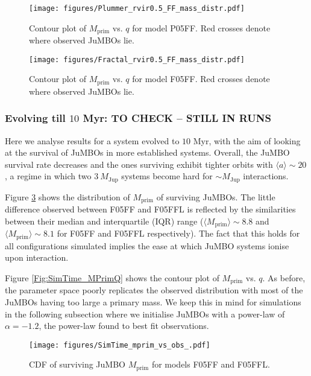 \documentclass[aa]{aa}
\begin{document}
   \begin{figure}
    \centering
        \texttt{[image: figures/Plummer\_rvir0.5\_FF\_mass\_distr.pdf]}
        \caption{Contour plot of $M_{\mathrm{prim}}$ vs. $q$ for model P05FF. Red crosses denote where observed JuMBOs lie.}
         \label{Fig:Gen_mdistr_Plummer}
   \end{figure}
   
   \begin{figure}
    \centering
        \texttt{[image: figures/Fractal\_rvir0.5\_FF\_mass\_distr.pdf]}
        \caption{Contour plot of $M_{\mathrm{prim}}$ vs. $q$ for model F05FF. Red crosses denote where observed JuMBOs lie.}
         \label{Fig:Gen_mdistr_Fractal}
   \end{figure}

    \subsubsection{Evolving till $10$ Myr: TO CHECK -- STILL IN RUNS}
        Here we analyse results for a system evolved to $10$ Myr, with the aim of looking at the survival of JuMBOs in more established systems. Overall, the JuMBO survival rate decreases and the ones surviving exhibit tighter orbits with $\langle a\rangle \sim 20$, a regime in which two $3\ M_{\mathrm{Jup}}$ systems become hard for $\sim M_{\mathrm{Jup}}$ interactions. 
        
        Figure \ref{Fig:Mdistr_SimTime} shows the distribution of $M_{\mathrm{prim}}$ of surviving JuMBOs. The little difference  observed between F05FF and F05FFL is reflected by the similarities between their median and interquartile (IQR) range ($\langle M_{\mathrm{prim}}\rangle\sim 8.8$ and $\langle M_{\mathrm{prim}}\rangle \sim 8.1$ for F05FF and F05FFL respectively). The fact that this holds for all configurations simulated implies the ease at which JuMBO systems ionise upon interaction.

        Figure \ref{Fig:SimTime_MPrimQ} shows the contour plot of $M_{\mathrm{prim}}$ vs. $q$. As before, the parameter space poorly replicates the observed distribution with most of the JuMBOs having too large a primary mass. We keep this in mind for simulations in the following subsection where we initialise JuMBOs with a power-law of $\alpha = -1.2$, the power-law found to best fit observations.
   
   \begin{figure}
    \centering
        \texttt{[image: figures/SimTime\_mprim\_vs\_obs\_.pdf]}
        \caption{CDF of surviving JuMBO $M_{\mathrm{prim}}$ for models F05FF and F05FFL.}
         \label{Fig:Mdistr_SimTime}
   \end{figure}
   
\end{document}
